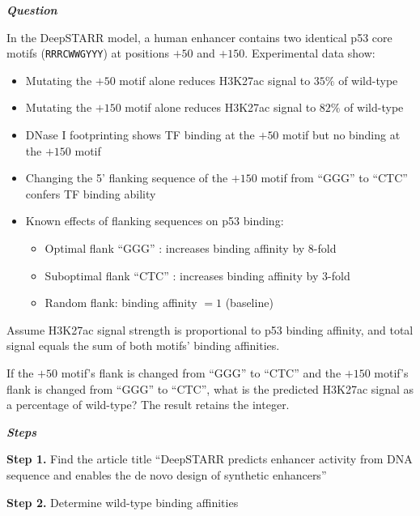 \begin{tcolorbox}[
    breakable,
    title=Example of Scientific Deep Research in Life,
    colback=LighterGray,
    colframe=DeepPurple,
    colbacktitle=DeepPurple,
    coltitle=White,
]
\textbf{\emph{\textcolor{DeepPurple}{Question}}}

In the DeepSTARR model, a human enhancer contains two identical p53 core motifs (\texttt{RRRCWWGYYY}) at positions $+50$ and $+150$. Experimental data show:
\begin{itemize}
    \item Mutating the $+50$ motif alone reduces H3K27ac signal to $35\%$ of wild-type
    \item Mutating the $+150$ motif alone reduces H3K27ac signal to $82\%$ of wild-type
    \item DNase I footprinting shows TF binding at the $+50$ motif but no binding at the $+150$ motif
    \item Changing the 5' flanking sequence of the $+150$ motif from ``GGG'' to ``CTC'' confers TF binding ability
    \item Known effects of flanking sequences on p53 binding:
    \begin{itemize}
        \item Optimal flank ``GGG'' : increases binding affinity by $8$-fold
        \item Suboptimal flank ``CTC'' : increases binding affinity by $3$-fold
        \item Random flank: binding affinity $= 1$ (baseline)
    \end{itemize}
\end{itemize}
Assume H3K27ac signal strength is proportional to p53 binding affinity, and total signal equals the sum of both motifs' binding affinities.

If the $+50$ motif's flank is changed from ``GGG'' to ``CTC'' and the $+150$ motif's flank is changed from ``GGG'' to ``CTC'', what is the predicted H3K27ac signal as a percentage of wild-type? The result retains the integer.

\textbf{\emph{\textcolor{DeepPurple}{Steps}}}

\textbf{\textcolor{CaseOrange}{Step 1.}} Find the article title ``DeepSTARR predicts enhancer activity from DNA sequence and enables the de novo design of synthetic enhancers''

\textbf{\textcolor{CaseOrange}{Step 2.}} Determine wild-type binding affinities


\end{tcolorbox}
